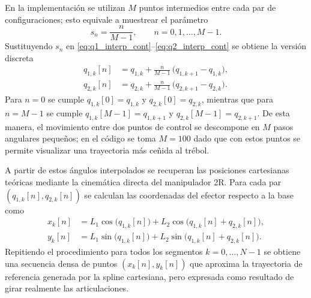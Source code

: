\documentclass[11pt,a4paper]{article}
\begin{document}
En la implementación se utilizan $M$ puntos intermedios entre cada par de configuraciones; esto equivale a muestrear el parámetro
\[
s_n = \frac{n}{M-1}, \qquad n = 0,1,\dots,M-1.
\]
Sustituyendo $s_n$ en \eqref{eq:q1_interp_cont}–\eqref{eq:q2_interp_cont} se obtiene la versión discreta
\begin{align}
q_{1,k}[n] &= q_{1,k} + \frac{n}{M-1}\,\bigl(q_{1,k+1}-q_{1,k}\bigr), \label{eq:q1_interp_disc}\\
q_{2,k}[n] &= q_{2,k} + \frac{n}{M-1}\,\bigl(q_{2,k+1}-q_{2,k}\bigr). \label{eq:q2_interp_disc}
\end{align}
Para $n=0$ se cumple $q_{1,k}[0]=q_{1,k}$ y $q_{2,k}[0]=q_{2,k}$, mientras que para $n=M-1$ se cumple $q_{1,k}[M-1]=q_{1,k+1}$ y $q_{2,k}[M-1]=q_{2,k+1}$. De esta manera, el movimiento entre dos puntos de control se descompone en $M$ pasos angulares pequeños; en el código se toma $M=100$ dado que con estos puntos se permite visualizar una trayectoria más ceñida al trébol.

A partir de estos ángulos interpolados se recuperan las posiciones cartesianas teóricas mediante la cinemática directa del manipulador 2R. Para cada par $(q_{1,k}[n],q_{2,k}[n])$ se calculan las coordenadas del efector respecto a la base como
\begin{align}
x_{k}[n] &= L_1 \cos\bigl(q_{1,k}[n]\bigr)
         + L_2 \cos\bigl(q_{1,k}[n] + q_{2,k}[n]\bigr),\\
y_{k}[n] &= L_1 \sin\bigl(q_{1,k}[n]\bigr)
         + L_2 \sin\bigl(q_{1,k}[n] + q_{2,k}[n]\bigr).
\end{align}
Repitiendo el procedimiento para todos los segmentos $k=0,\dots,N-1$ se obtiene una secuencia densa de puntos $(x_{k}[n],y_{k}[n])$ que aproxima la trayectoria de referencia generada por la spline cartesiana, pero expresada como resultado de girar realmente las articulaciones.
\end{document}
